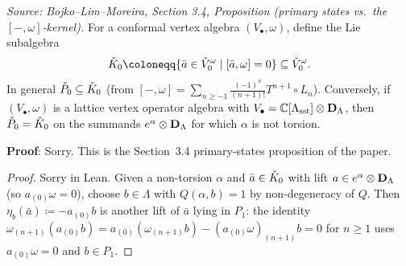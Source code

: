 \begin{proposition}[PrimaryStatesEqualKernel]
  \label{prop:primaryomegabracket}
  \textit{Source: Bojko--Lim--Moreira, Section 3.4, Proposition (primary states vs.\
  the \([-,\omega]\)-kernel).}
  For a conformal vertex algebra \((V_\bullet, \omega)\), define the Lie subalgebra
  \[\widecheck{K}_0 \coloneqq \{\bar{a} \in \widecheck{V}_0^\omega \mid [\bar{a}, \omega] = 0\}
    \subseteq \widecheck{V}_0^\omega.\]
  In general \(\widecheck{P}_0 \subseteq \widecheck{K}_0\) (from
  \([-,\omega] = \sum_{n \geq -1} \tfrac{(-1)^n}{(n+1)!} T^{n+1} \circ L_n\)).
  Conversely, if \((V_\bullet, \omega)\) is a lattice vertex operator algebra with
  \(V_\bullet = \mathbb{C}[\Lambda_\sst] \otimes \BD_\Lambda\), then
  \(\widecheck{P}_0 = \widecheck{K}_0\) on the summands \(e^\alpha \otimes \BD_\Lambda\)
  for which \(\alpha\) is not torsion.

  \textbf{Proof}: Sorry. This is the Section~3.4 primary-states proposition of the paper.
\end{proposition}

\begin{proof}
  Sorry in Lean. Given a non-torsion \(\alpha\) and \(\bar{a} \in \widecheck{K}_0\)
  with lift \(a \in e^\alpha \otimes \BD_\Lambda\) (so \(a_{(0)}\omega = 0\)), choose
  \(b \in \Lambda\) with \(Q(\alpha, b) = 1\) by non-degeneracy of \(Q\). Then
  \(\eta_b(\bar{a}) \coloneqq -a_{(0)}b\) is another lift of \(\bar{a}\) lying in
  \(P_1\): the identity
  \(\omega_{(n+1)}(a_{(0)}b) = a_{(0)}(\omega_{(n+1)}b) - (a_{(0)}\omega)_{(n+1)}b = 0\)
  for \(n \geq 1\) uses \(a_{(0)}\omega = 0\) and \(b \in P_1\).
\end{proof}


